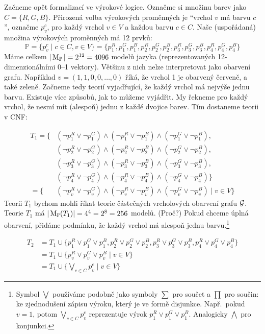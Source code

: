 Začneme opět formalizací ve výrokové logice. Označme si množinu barev jako \( C=\{R,G,B\} \).  Přirozená volba výrokových proměnných je ``vrchol \(v\) má barvu \(c\)'', označme \(p_v^c\), pro každý vrchol \(v \in V\) a každou barvu \(c\in C\). Naše (uspořádaná) množina výrokových proměnných má 12 prvků:
\[
\mathbb P=\{p_v^c\mid c\in C,v\in V\}=\{p_1^R,p_1^G,p_1^B,p_2^R,p_2^G,p_2^B,p_3^R,p_3^G,p_3^B,p_4^R,p_4^G,p_4^B\}
\]
Máme celkem \( |\operatorname{M}_\mathbb P|=2^{12}=4096 \) modelů jazyka (reprezentovaných 12-dimenzionálními 0--1 vektory). Většinu z nich nelze interpretovat jako obarvení grafu. Například \( v=(1,1,0,0,\dots,0) \) říká, že vrchol 1 je obarvený červeně, a také zeleně. Začneme tedy teorií vyjadřující, že každý vrchol má nejvýše jednu barvu. Existuje více způsobů, jak to můžeme vyjádřit. My řekneme pro každý vrchol, že nesmí mít (alespoň) jednu z každé dvojice barev. Tím dostaneme teorii v {CNF}:

\begin{align*}
T_1 = \{ 
&(\neg p_1^R \lor \neg p_1^G) \land (\neg p_1^R \lor \neg p_1^B) \land (\neg p_1^G \lor \neg p_1^B),\\
&(\neg p_2^R \lor \neg p_2^G) \land (\neg p_2^R \lor \neg p_2^B) \land (\neg p_2^G \lor \neg p_2^B),\\
&(\neg p_3^R \lor \neg p_3^G) \land (\neg p_3^R \lor \neg p_3^B) \land (\neg p_3^G \lor \neg p_3^B),\\
&(\neg p_4^R \lor \neg p_4^G) \land (\neg p_4^R \lor \neg p_4^B) \land (\neg p_4^G \lor \neg p_4^B)\} \\
    = \{ &(\neg p_v^R \lor \neg p_v^G) \land (\neg p_v^R \lor \neg p_v^B) \land (\neg p_v^G \lor \neg p_v^B) \mid v \in V \} 
\end{align*}
Teorii \(T_1\) bychom mohli říkat teorie částečných vrcholových obarvení grafu \(\mathcal{G}\). Teorie \(T_1\) má \(|\operatorname{M}_\mathbb P(T_1)|= 4^4=2^8=256\) modelů. (Proč?) Pokud chceme úplná obarvení, přidáme podmínku, že každý vrchol má alespoň jednu barvu.\footnote{Symbol \(\bigvee \) používáme podobně jako symboly \(\sum \) pro součet a \(\prod \) pro součin: ke zjednodušení zápisu výroku, který je ve formě disjunkce. Např.\ pokud \(v=1\), potom \( \bigvee_{c\in C} p_v^c \) reprezentuje výrok \( p_1^R \lor p_1^G \lor p_1^B \). Analogicky \(\bigwedge \) pro konjunkci.}

\begin{align*}
T_2 &= T_1\cup \{p_1^R \lor p_1^G \lor p_1^B, p_2^R \lor p_2^G \lor p_2^B, p_3^R \lor p_3^G \lor p_3^B, p_4^R \lor p_4^G \lor p_4^B\} \\
    &= T_1\cup \{ p_v^R \lor p_v^G \lor p_v^B \mid v \in V \} \\
    &= T_1\cup \{\bigvee_{c\in C} p_v^c \mid v \in V \}  
\end{align*}

